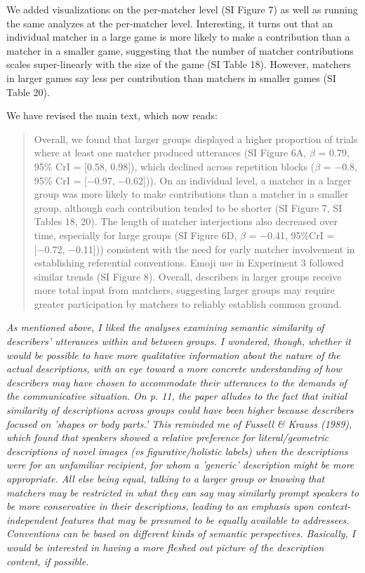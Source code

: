 \documentclass{stanfordletter}
\newcommand{\theysaid}[1]{\begin{leftbar} \noindent 
		\textsl{ #1}\end{leftbar}}
\newcommand{\revised}[1]{\begin{quote}	#1 \end{quote}}
\begin{document}
\begin{letter}{}
          We added visualizations on the per-matcher level  (SI Figure 7) as well as running the same analyzes at the per-matcher level. Interesting, it turns out that an individual matcher in a large game is more likely to make a contribution than a matcher in a smaller game, suggesting that the number of matcher contributions scales super-linearly with the size of the game (SI Table 18). However, matchers in larger games say less per contribution than matchers in smaller games (SI Table 20). 
         
          We have revised the main text, which now reads:
          
          \revised{Overall, we found that larger groups displayed a higher proportion of trials where at least one matcher produced utterances (SI Figure 6A, $\beta$ = 0.79, 95\% CrI = [0.58, 0.98]), which declined across repetition blocks ($\beta$ =
          	−0.8, 95\% CrI = [−0.97, −0.62])). On an individual level, a matcher in a larger group was more likely to make contributions than a matcher in a smaller group, although each contribution tended to be shorter (SI Figure 7, SI Tables 18, 20).
          The length of matcher interjections also decreased over time, especially for large groups (SI Figure           6D, $\beta$ = −0.41, 95\%CrI = [−0.72, −0.11])) consistent with the need for early matcher involvement in establishing referential conventions. 
          Emoji use in Experiment 3 followed similar trends (SI Figure 8).
          Overall, describers in larger groups receive more total input from matchers, suggesting larger groups may require greater participation by matchers to reliably establish common ground.}
         
          
          \theysaid{As mentioned above, I liked the analyses examining semantic similarity of describers' utterances within and between groups. I wondered, though, whether it would be possible to have more qualitative information about the nature of the actual descriptions, with an eye toward a more concrete understanding of how describers may have chosen to accommodate their utterances to the demands of the communicative situation. On p. 11, the paper alludes to the fact that initial similarity of descriptions across groups could have been higher because describers focused on 'shapes or body parts.' This reminded me of Fussell \& Krauss (1989), which found that speakers showed a relative preference for literal/geometric descriptions of novel images (vs figurative/holistic labels) when the descriptions were for an unfamiliar recipient, for whom a 'generic' description might be more appropriate. All else being equal, talking to a larger group or knowing that matchers may be restricted in what they can say may similarly prompt speakers to be more conservative in their descriptions, leading to an emphasis upon context-independent features that may be presumed to be equally available to addressees. Conventions can be based on different kinds of semantic perspectives. Basically, I would be interested in having a more fleshed out picture of the description content, if possible.}



\end{letter}
\end{document}
